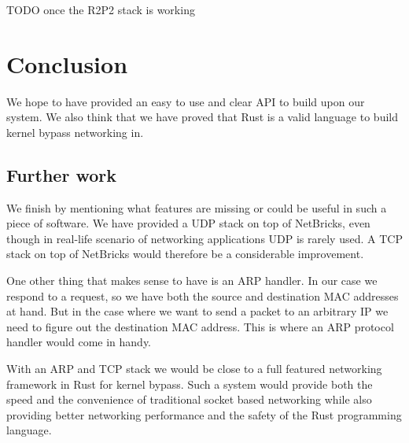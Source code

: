 \documentclass[11pt]{article}
\begin{document}
TODO once the R2P2 stack is working

\section{Conclusion}

We hope to have provided an easy to use and clear API to build upon
our system. We also think that we have proved that Rust is a valid
language to build kernel bypass networking in.

\subsection{Further work}

We finish by mentioning what features are missing or could be useful
in such a piece of software. We have provided a UDP stack on top of
NetBricks, even though in real-life scenario of networking
applications UDP is rarely used. A TCP stack on top of NetBricks would
therefore be a considerable improvement.

One other thing that makes sense to have is an ARP handler. In our
case we respond to a request, so we have both the source and
destination MAC addresses at hand. But in the case where we want to
send a packet to an arbitrary IP we need to figure out the destination
MAC address. This is where an ARP protocol handler would come in
handy.

With an ARP and TCP stack we would be close to a full featured
networking framework in Rust for kernel bypass. Such a system would
provide both the speed and the convenience of traditional socket based
networking while also providing better networking performance and the
safety of the Rust programming language.

\newpage
{}

{}
\end{document}
